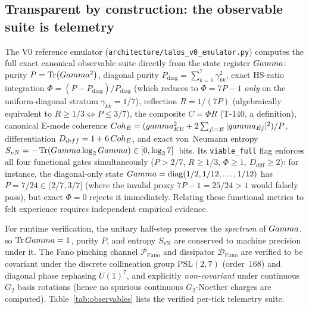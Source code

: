 \subsection{Transparent by construction: the observable suite is telemetry}
\label{subsec:telemetry}

The V0 reference emulator (\texttt{architecture/talos\_v0\_emulator.py})
computes the full exact canonical observable suite directly from the state
register $Gamma$: purity $P=\Tr(Gamma^2)$, diagonal purity
$P_{\mathrm{diag}}=\sum_{k=1}^7\gamma_{kk}^2$, exact HS-ratio integration
$\Phi=(P-P_{\mathrm{diag}})/P_{\mathrm{diag}}$ (which reduces to $\Phi=7P-1$
\emph{only} on the uniform-diagonal stratum $\gamma_{kk}=1/7$), reflection
$R=1/(7P)$ (algebraically equivalent to $R\ge 1/3\Leftrightarrow P\le 3/7$),
the composite $C=\Phi R$ (T-140, a definition), canonical E-mode coherence
$Coh_E=(gamma_{EE}^2+2\sum_{j!= E}|gamma_{Ej}|^2)/P$, differentiation
$D_{diff}=1+6\,Coh_E$, and exact von~Neumann entropy
$S_{vN}=-\Tr(Gamma\log_2Gamma)\in[0,\log_2 7]$~bits. Its
\texttt{viable\_full} flag enforces all four functional gates simultaneously
($P>2/7$, $R\ge 1/3$, $\Phi\ge 1$, $D_{\mathrm{diff}}\ge 2$): for instance, the
diagonal-only state $Gamma=\operatorname{diag}(1/2,1/12,\ldots,1/12)$ has
$P=7/24\in(2/7,3/7]$ (where the invalid proxy $7P-1=25/24>1$ would falsely
pass), but exact $\Phi=0$ rejects it immediately. Relating these functional
metrics to felt experience requires independent empirical evidence.

For runtime verification, the unitary half-step preserves the \emph{spectrum}
of $Gamma$, so $\Tr Gamma=1$, purity $P$, and entropy $S_{\mathrm{vN}}$ are
conserved to machine precision under it. The Fano pinching channel
$\mathcal{P}_{\mathrm{Fano}}$ and dissipator $\mathcal{D}_{\mathrm{Fano}}$ are
verified to be covariant under the discrete collineation group
$\mathrm{PSL}(2,7)$ (order~$168$) and diagonal phase rephasing $U(1)^7$, and
explicitly \emph{non-covariant} under continuous $G_2$ basis rotations (hence
no spurious continuous $G_2$-Noether charges are computed). Table~\ref{tab:observables}
lists the verified per-tick telemetry suite.

